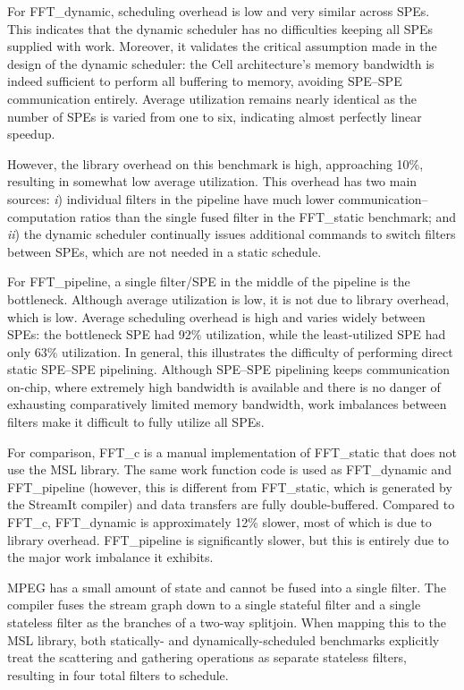 For \textsf{FFT\_dynamic}, scheduling overhead is low and very similar across SPEs.
This indicates that the dynamic scheduler has no difficulties keeping all SPEs supplied with work.
Moreover, it validates the critical assumption made in the design of the dynamic scheduler:
the Cell architecture's memory bandwidth is indeed sufficient to perform all buffering to memory, avoiding SPE--SPE communication entirely.
Average utilization remains nearly identical as the number of SPEs is varied from one to six,
indicating almost perfectly linear speedup.

However, the library overhead on this benchmark is high, approaching 10\%, resulting in somewhat low average utilization. This overhead has two main sources: \emph{i}) individual filters in the pipeline have much lower communication--computation ratios than the single fused filter in the \textsf{FFT\_static} benchmark; and \emph{ii}) the dynamic scheduler continually issues additional commands to switch filters between SPEs, which are not needed in a static schedule.

For \textsf{FFT\_pipeline}, a single filter/SPE in the middle of the pipeline is the bottleneck.
Although average utilization is low, it is not due to library overhead, which is low.
Average scheduling overhead is high and varies widely between SPEs:
the bottleneck SPE had 92\% utilization, while the least-utilized SPE had only 63\% utilization.
In general, this illustrates the difficulty of performing direct static SPE--SPE pipelining.
Although SPE--SPE pipelining keeps communication on-chip, where extremely high bandwidth
is available and there is no danger of exhausting comparatively limited memory bandwidth,
work imbalances between filters make it difficult to fully utilize all SPEs.

For comparison, \textsf{FFT\_c} is a manual implementation of \textsf{FFT\_static} that
does not use the MSL library. The same work function code is used as \textsf{FFT\_dynamic} and
\textsf{FFT\_pipeline} (however, this is different from \textsf{FFT\_static},
which is generated by the StreamIt compiler) and data transfers are fully double-buffered.
Compared to \textsf{FFT\_c}, \textsf{FFT\_dynamic} is approximately 12\% slower, most of which
is due to library overhead. \textsf{FFT\_pipeline} is significantly slower, but this
is entirely due to the major work imbalance it exhibits.

MPEG has a small amount of state and cannot be fused into a single filter.
The compiler fuses the stream graph down to a single stateful filter and
a single stateless filter as the branches of a two-way splitjoin.
When mapping this to the MSL library, both statically- and dynamically-scheduled benchmarks
explicitly treat the scattering and gathering operations as separate stateless filters,
resulting in four total filters to schedule.

